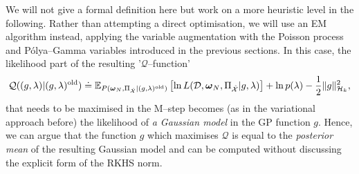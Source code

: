 \documentclass[twoside,11pt]{article}
\newcommand{\dataset}{{\cal D}}
\newcommand{\EE}[2]{\mathbb{E}_{#1}\left[ #2 \right]}
\newcommand{\bomega}{\boldsymbol{\omega}}
\newcommand{\calH}{\mathcal{H}}
\newcommand{\X}{\mathcal{X}}
\newcommand{\Q}{\mathcal{Q}}
\begin{document}
We will not give a formal definition
here  but work on a more heuristic level in the following. Rather than attempting 
a direct optimisation, we will use an EM algorithm instead, applying the variable augmentation with the Poisson process and P\'olya--Gamma variables introduced in the previous sections. 
In this case, the likelihood part of the resulting '$\Q$--function' 
\begin{equation}\label{eq:Qfunction}
\Q((g,\lambda)\vert (g,\lambda)^{\rm old}) \doteq \EE{P(\bomega_N,\Pi_{\hat{\X}}\vert (g,\lambda)^{\rm old})}{\ln L(\dataset,\bomega_N,\Pi_{\hat{\X}}\vert g,\lambda)} + \ln p(\lambda) - \frac{1}{2}\Vert g \Vert_{\calH_k}^2,
\end{equation}
that needs to be maximised in the M--step becomes (as in the variational approach before) the likelihood
of {\em a Gaussian model} in the GP function $g$. 
Hence, we can argue that the function $g$ which maximises $\Q$ is equal to the {\em posterior mean} of the resulting Gaussian model and can be computed
without discussing the explicit form of the RKHS norm.  
\end{document}
